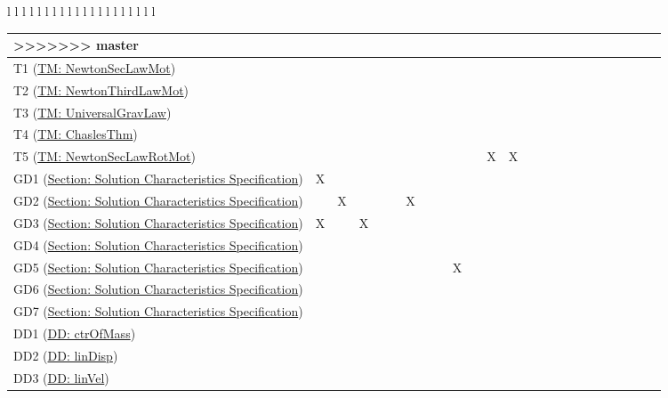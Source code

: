 \documentclass[12pt]{article}
\begin{document}
\begin{longtable}{l l l l l l l l l l l l l l l l l l l l}
\begin{longtable}{l l l l l l l l l l l l l l l l l l l l l l l l}
>>>>>>> master
\\
\midrule
\endhead
T1 (\hyperref[TM:NewtonSecLawMot]{TM: NewtonSecLawMot}) &  &  &  &  &  &  &  &  &  &  &  &  &  &  &  &  &  &  &  &  &  &  & 
\\
T2 (\hyperref[TM:NewtonThirdLawMot]{TM: NewtonThirdLawMot}) &  &  &  &  &  &  &  &  &  &  &  &  &  &  &  &  &  &  &  &  &  &  & 
\\
T3 (\hyperref[TM:UniversalGravLaw]{TM: UniversalGravLaw}) &  &  &  &  &  &  &  &  &  &  &  &  &  &  &  &  &  &  &  &  &  &  & 
\\
T4 (\hyperref[TM:ChaslesThm]{TM: ChaslesThm}) &  &  &  &  &  &  &  &  &  &  &  &  &  &  &  &  &  &  &  &  &  &  & 
\\
T5 (\hyperref[TM:NewtonSecLawRotMot]{TM: NewtonSecLawRotMot}) &  &  &  &  &  &  &  &  &  &  & X & X &  &  &  &  &  &  &  &  &  &  & 
\\
GD1 (\hyperref[Sec:SolCharSpec]{Section: Solution Characteristics Specification}) & X &  &  &  &  &  &  &  &  &  &  &  &  &  &  &  &  &  &  &  &  &  & 
\\
GD2 (\hyperref[Sec:SolCharSpec]{Section: Solution Characteristics Specification}) &  & X &  &  &  & X &  &  &  &  &  &  &  &  &  &  &  &  &  &  &  &  & 
\\
GD3 (\hyperref[Sec:SolCharSpec]{Section: Solution Characteristics Specification}) & X &  & X &  &  &  &  &  &  &  &  &  &  &  &  &  &  &  &  &  &  &  & 
\\
GD4 (\hyperref[Sec:SolCharSpec]{Section: Solution Characteristics Specification}) &  &  &  &  &  &  &  &  &  &  &  &  &  &  &  &  &  &  &  &  &  &  & 
\\
GD5 (\hyperref[Sec:SolCharSpec]{Section: Solution Characteristics Specification}) &  &  &  &  &  &  &  &  & X &  &  &  &  &  &  &  &  &  &  &  &  &  & 
\\
GD6 (\hyperref[Sec:SolCharSpec]{Section: Solution Characteristics Specification}) &  &  &  &  &  &  &  &  &  &  &  &  &  &  &  &  &  &  &  &  &  &  & 
\\
GD7 (\hyperref[Sec:SolCharSpec]{Section: Solution Characteristics Specification}) &  &  &  &  &  &  &  &  &  &  &  &  &  &  &  &  &  &  &  &  &  &  & 
\\
DD1 (\hyperref[DD:ctrOfMass]{DD: ctrOfMass}) &  &  &  &  &  &  &  &  &  &  &  &  &  &  &  &  &  &  &  &  &  &  & 
\\
DD2 (\hyperref[DD:linDisp]{DD: linDisp}) &  &  &  &  &  &  &  &  &  &  &  &  &  &  &  &  &  &  &  &  &  &  & 
\\
DD3 (\hyperref[DD:linVel]{DD: linVel}) &  &  &  &  &  &  &  &  &  &  &  &  &  &  &  &  &  &  &  &  &  &  & 

\end{longtable}
\end{longtable}
\end{document}
